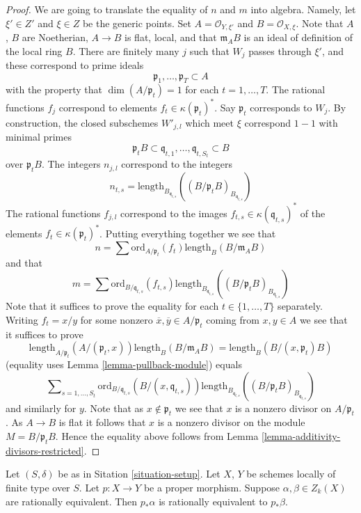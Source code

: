 \begin{proof}
\medskip\noindent
We are going to translate the equality of $n$ and $m$ into algebra.
Namely, let $\xi' \in Z'$ and $\xi \in Z$ be the generic points.
Set $A = \mathcal{O}_{Y, \xi'}$ and $B = \mathcal{O}_{X, \xi}$.
Note that $A$, $B$ are Noetherian, $A \to B$ is flat, local,
and that $\mathfrak m_AB$ is an ideal of definition of the local ring $B$.
There are finitely many $j$ such that $W_j$ passes through
$\xi'$, and these correspond to prime ideals
$$
\mathfrak p_1, \ldots, \mathfrak p_T \subset A
$$
with the property that $\dim(A/\mathfrak p_t) = 1$ for each
$t = 1, \ldots, T$. The rational functions $f_j$ correspond
to elements $f_t \in \kappa(\mathfrak p_t)^*$.
Say $\mathfrak p_t$ corresponds to $W_j$.
By construction, the closed subschemes $W'_{j, l}$ which meet
$\xi$ correspond $1 - 1$ with minimal primes
$$
\mathfrak p_tB
\subset
\mathfrak q_{t, 1}, \ldots, \mathfrak q_{t, S_t}
\subset
B
$$
over $\mathfrak p_tB$.
The integers $n_{j, l}$ correspond to the integers
$$
n_{t, s} = \text{length}_{B_{\mathfrak q_{t, s}}}
((B/\mathfrak p_tB)_{B_{\mathfrak q_{t, s}}})
$$
The rational functions $f_{j, l}$ correspond to the images
$f_{t, s} \in \kappa(\mathfrak q_{t, s})^*$ of the elements
$f_t \in \kappa(\mathfrak p_t)^*$. Putting everything together
we see that
$$
n = \sum \text{ord}_{A/\mathfrak p_t}(f_t)\text{length}_B(B/\mathfrak m_AB)
$$
and that
$$
m = \sum \text{ord}_{B/\mathfrak q_{t, s}}(f_{t, s})
\text{length}_{B_{\mathfrak q_{t, s}}}
((B/\mathfrak p_tB)_{B_{\mathfrak q_{t, s}}})
$$
Note that it suffices to prove the equality for each
$t \in \{1, \ldots, T\}$ separately. Writing $f_t = x/y$
for some nonzero $\overline{x}, \overline{y} \in A/\mathfrak p_t$
coming from $x, y\in A$ we see that it suffices
to prove
$$
\text{length}_{A/\mathfrak p_t}(A/(\mathfrak p_t, x))
\text{length}_B(B/\mathfrak m_AB)
=
\text{length}_B(B/(x, \mathfrak p_t)B)
$$
(equality uses Lemma \ref{lemma-pullback-module})
equals
$$
\sum\nolimits_{s = 1, \ldots, S_t}
\text{ord}_{B/\mathfrak q_{t, s}}(B/(x, \mathfrak q_{t, s}))
\text{length}_{B_{\mathfrak q_{t, s}}}
((B/\mathfrak p_tB)_{B_{\mathfrak q_{t, s}}})
$$
and similarly for $y$. Note that as $x \not \in \mathfrak p_t$ we
see that $x$ is a nonzero divisor on $A/\mathfrak p_t$. As $A \to B$
is flat it follows that $x$ is a nonzero divisor on the module
$M = B/\mathfrak p_tB$. Hence the equality above follows from
Lemma \ref{lemma-additivity-divisors-restricted}.
\end{proof}

\begin{lemma}
\label{lemma-proper-pushforward-rational-equivalence}
Let $(S, \delta)$ be as in Sitation \ref{situation-setup}.
Let $X$, $Y$ be schemes locally of finite type over $S$.
Let $p : X \to Y$ be a proper morphism.
Suppose $\alpha, \beta \in Z_k(X)$ are rationally equivalent.
Then $p_*\alpha$ is rationally equivalent to $p_*\beta$.
\end{lemma}

